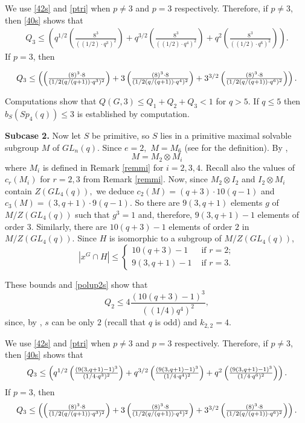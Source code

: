 We use \eqref{42s} and \eqref{ptri} when $p\ne 3$ and $p=3$ respectively.  Therefore, if $p \ne 3$, then \eqref{40s}  shows that
\begin{equation*}
\begin{aligned}
Q_{3} \le \left(q^{1/2}\left(\frac{8^3}{((1/2) \cdot q^3)^2} \right) +q^{3/2}\left(\frac{8^3}{((1/2) \cdot q^4)^2} \right) + q^2\left(\frac{8^3}{((1/2) \cdot q^{6})^2} \right) \right).
\end{aligned}
\end{equation*}
If $p = 3$, then

$$\Scale[0.99]{Q_3 \le \left(\left(\frac{(8)^3 \cdot 8}{(1/2 (q/(q+1)) \cdot q^3)^2} \right) +3\left(\frac{(8)^3 \cdot 8}{(1/2 (q/(q+1)) \cdot q^4)^2} \right) + 3^{3/2}\left(\frac{(8)^3 \cdot 8}{(1/2 (q/(q+1)) \cdot q^{6})^2} \right) \right).} 
$$ 

Computations show that $Q(G,3)\le Q_1+ Q_2+Q_3 <1$ for $q>5.$ If $q \le 5$ then  $b_S(Sp_4(q)) \le 3$ is established by computation.

\bigskip

{\bf Subcase 2.} Now let $S$ be primitive, so $S$ lies in a  primitive maximal solvable  subgroup $M$ of $GL_n(q).$ Since $e=2,$ $M=M_6$ (see \cite[\S 8.1]{short} for the definition). By \cite[Proposition 8.2.1]{short}, 
$$M=M_2 \otimes M_i$$
where $M_i$ is defined in Remark \ref{remmi} for $i=2,3,4.$ Recall also the values of $c_r(M_i)$ for $r=2,3$ from Remark \ref{remmi}.  Now, since $M_2 \otimes I_2$ and $I_2 \otimes M_i$ contain $Z(GL_4(q)),$ we deduce $c_2(M)=(q+3) \cdot 10(q-1)$  and $c_3(M)=(3, q+1) \cdot 9(q-1).$ So there are $9(3, q+1)$ elements $g$ of $M/Z(GL_4(q))$ such that $g^3=1$ and, therefore,  $9(3, q+1)-1$ elements of order $3$. Similarly, there are $10(q+3)-1$ elements of order $2$ in $M/Z(GL_4(q)).$ Since $H$ is isomorphic to a subgroup of $M/Z(GL_4(q))$,
$$|x^G \cap H| \le
\begin{cases}
10(q+3)-1 &\text{ if } r=2;\\
 9(3,q+1)-1 &\text{ if } r=3.
\end{cases}
$$ 

These bounds and \eqref{polup2s} show that
$$
Q_2 
\le   4\frac{(10(q+3)-1)^3}{((1/4)q^4)^2},
$$ since, by \cite[Table 3.8]{fpr2}, $s$ can be only  $2$ (recall that $q$ is odd) and $k_{2,2}=4.$ 

We use \eqref{42s} and \eqref{ptri} when $p\ne 3$ and $p=3$ respectively. Therefore, if $p \ne 3$, then \eqref{40s}  shows that
\begin{equation*}
\begin{aligned}
\Scale[0.99]{
Q_{3} \le  \left(q^{1/2}\left(\frac{(9(3,q+1)-1)^3}{(1/4 \cdot q^3)^2} \right) +q^{3/2}\left(\frac{(9(3,q+1)-1)^3}{(1/4 \cdot q^4)^2} \right) + q^2\left(\frac{(9(3,q+1)-1)^3}{(1/4 \cdot q^{6})^2} \right) \right).}
\end{aligned}
\end{equation*}
If $p = 3$, then
$$\Scale[0.99]{Q_3 \le \left(\left(\frac{(8)^3 \cdot 8}{(1/2 (q/(q+1)) \cdot q^3)^2} \right) +3\left(\frac{(8)^3 \cdot 8}{(1/2 (q/(q+1)) \cdot q^4)^2} \right) + 3^{3/2}\left(\frac{(8)^3 \cdot 8}{(1/2 (q/(q+1)) \cdot q^{6})^2} \right) \right).} 
$$  

